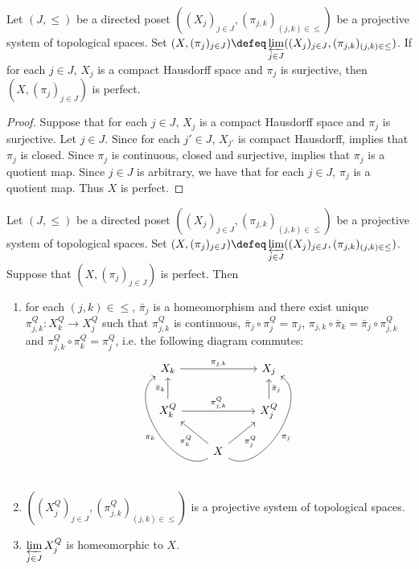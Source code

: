 \documentclass{book}
\begin{document}
\begin{ex} 
	Let $(J, {\leq})$ be a directed poset $((X_j)_{j \in J}, (\pi_{j,k})_{(j,k) \in \leq})$ be a projective system of topological spaces. Set $(X, (\pi_j)_{j \in J}) \defeq \varprojlim\limits_{j \in J} ((X_j)_{j \in J}, (\pi_{j,k})_{(j,k) \in \leq})$. If for each $j \in J$, $X_j$ is a compact Hausdorff space and $\pi_j$ is surjective, then $(X, (\pi_j)_{j \in J})$ is perfect. 
\end{ex}

\begin{proof}
	Suppose that for each $j \in J$, $X_j$ is a compact Hausdorff space and $\pi_j$ is surjective. Let $j \in J$. Since for each $j' \in J$, $X_{j'}$ is compact Hausdorff,  implies that $\pi_j$ is closed. Since $\pi_j$ is continuous, closed and surjective,  implies that $\pi_j$ is a quotient map. Since $j \in J$ is arbitrary, we have that for each $j \in J$, $\pi_j$ is a quotient map. Thus $X$ is perfect.
\end{proof}

\begin{ex} 
	Let $(J, {\leq})$ be a directed poset $((X_j)_{j \in J}, (\pi_{j,k})_{(j,k) \in \leq})$ be a projective system of topological spaces. Set $(X, (\pi_j)_{j \in J}) \defeq \varprojlim\limits_{j \in J} ((X_j)_{j \in J}, (\pi_{j,k})_{(j,k) \in \leq})$. Suppose that $(X, (\pi_j)_{j \in J})$ is perfect. Then
	\begin{enumerate}
		\item for each $(j,k) \in {\leq}$, $\bar{\pi}_j$ is a homeomorphism and there exist unique $\pi^Q_{j, k}: X^Q_k \rightarrow X^Q_j$ such that $\pi^Q_{j, k}$ is continuous, $\bar{\pi}_j \circ \pi^Q_j = \pi_j$, $\pi_{j,k} \circ \bar{\pi}_k = \bar{\pi}_j \circ \pi^Q_{j, k}$ and $\pi^Q_{j, k} \circ \pi^Q_k = \pi^Q_j$, i.e. the following diagram commutes:
		\[ 
		\begin{tikzcd}
			X_k  \arrow[rr, "\pi_{j,k}"]   & & X_j   \\
			X^Q_k \arrow[u, "\bar{\pi}_k"]   \arrow[rr, "\pi^Q_{j, k}"] & &  X^Q_j \arrow[u, "\bar{\pi}_j"']  \\
			& X   \arrow[ul, "\pi^Q_k"] \arrow[ur, "\pi^Q_j"'] \arrow[bend left=90]{luu}{\pi_k} \arrow[bend right=90, swap]{ruu}{\pi_j}  & 
		\end{tikzcd}
		\]
		\item $((X^Q_j)_{j \in J}, (\pi_{j,k}^Q)_{(j,k) \in \leq})$ is a projective system of topological spaces. 
		\item $\varprojlim\limits_{j \in J} X^Q_j$ is homeomorphic to $X$. 
	\end{enumerate}
\end{ex}
\end{document}
